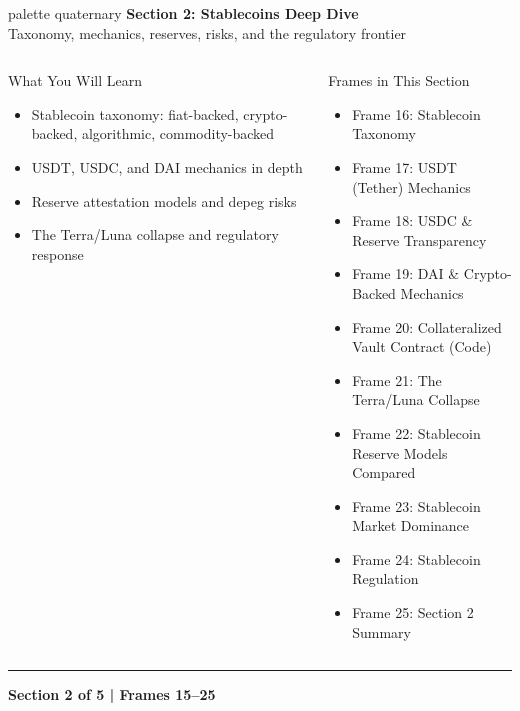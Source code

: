 \documentclass[8pt,aspectratio=169]{beamer}
\newcommand{\bottomnote}[1]{\vfill\vspace{-2mm}\textcolor{mllavender2}{\rule{\textwidth}{0.4pt}}\vspace{1mm}\footnotesize\textbf{#1}}
\begin{document}
\begin{frame}{}
\begin{beamercolorbox}[sep=12pt,center,rounded=true,shadow=true]{palette quaternary}
  {\Large\bfseries Section 2: Stablecoins Deep Dive}\\[6pt]
  {\normalsize Taxonomy, mechanics, reserves, risks, and the regulatory frontier}
\end{beamercolorbox}
\vspace{4mm}
\begin{columns}[T]
\begin{block}{What You Will Learn}
\footnotesize
\begin{itemize}
  \item Stablecoin taxonomy: fiat-backed, crypto-backed, algorithmic, commodity-backed
  \item USDT, USDC, and DAI mechanics in depth
  \item Reserve attestation models and depeg risks
  \item The Terra/Luna collapse and regulatory response
\end{itemize}
\end{block}
\begin{block}{Frames in This Section}
\footnotesize
\begin{itemize}
  \item Frame 16: Stablecoin Taxonomy
  \item Frame 17: USDT (Tether) Mechanics
  \item Frame 18: USDC \& Reserve Transparency
  \item Frame 19: DAI \& Crypto-Backed Mechanics
  \item Frame 20: Collateralized Vault Contract (Code)
  \item Frame 21: The Terra/Luna Collapse
  \item Frame 22: Stablecoin Reserve Models Compared
  \item Frame 23: Stablecoin Market Dominance
  \item Frame 24: Stablecoin Regulation
  \item Frame 25: Section 2 Summary
\end{itemize}
\end{block}
\end{columns}
\bottomnote{Section 2 of 5 | Frames 15--25}
\end{frame}
\end{document}
